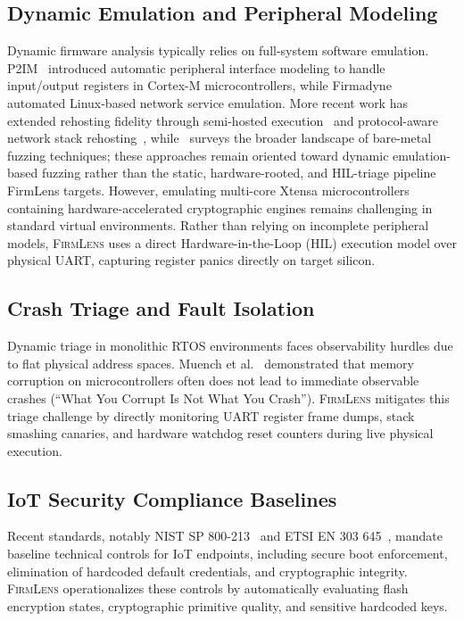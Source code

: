 \documentclass[conference]{IEEEtran}
\begin{document}
\subsection{Dynamic Emulation and Peripheral Modeling}

Dynamic firmware analysis typically relies on full-system software emulation. P2IM~\cite{feng2021p2im} introduced automatic peripheral interface modeling to handle input/output registers in Cortex-M microcontrollers, while Firmadyne~\cite{firmadyne2016} automated Linux-based network service emulation. More recent work has extended rehosting fidelity through semi-hosted execution~\cite{shift2024} and protocol-aware network stack rehosting~\cite{bley2025protocol}, while~\cite{baremetal_survey2025} surveys the broader landscape of bare-metal fuzzing techniques; these approaches remain oriented toward dynamic emulation-based fuzzing rather than the static, hardware-rooted, and HIL-triage pipeline FirmLens targets. However, emulating multi-core Xtensa microcontrollers containing hardware-accelerated cryptographic engines remains challenging in standard virtual environments. Rather than relying on incomplete peripheral models, \textsc{FirmLens} uses a direct Hardware-in-the-Loop (HIL) execution model over physical UART, capturing register panics directly on target silicon.

\subsection{Crash Triage and Fault Isolation}

Dynamic triage in monolithic RTOS environments faces observability hurdles due to flat physical address spaces. Muench et al.~\cite{muench2018what} demonstrated that memory corruption on microcontrollers often does not lead to immediate observable crashes (``What You Corrupt Is Not What You Crash''). \textsc{FirmLens} mitigates this triage challenge by directly monitoring UART register frame dumps, stack smashing canaries, and hardware watchdog reset counters during live physical execution.

\subsection{IoT Security Compliance Baselines}

Recent standards, notably NIST SP 800-213~\cite{nist800213} and ETSI EN 303 645~\cite{etsien303645}, mandate baseline technical controls for IoT endpoints, including secure boot enforcement, elimination of hardcoded default credentials, and cryptographic integrity. \textsc{FirmLens} operationalizes these controls by automatically evaluating flash encryption states, cryptographic primitive quality, and sensitive hardcoded keys.
\end{document}
